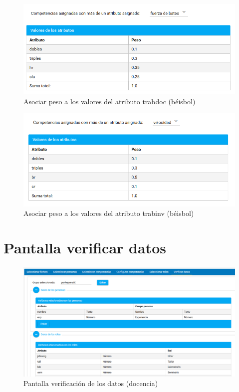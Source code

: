 {\begin{figure}[H]
	\centering
	\includegraphics[width=\textwidth]{figuras/beisbol_conf_comp_fb.png}
	\caption{Asociar peso a los valores del atributo trabdoc (béisbol)} \label{fig:conf_comp_fb_beisbol}
\end{figure}

\begin{figure}[H]
	\centering
	\includegraphics[width=\textwidth]{figuras/beisbol_conf_comp_v.png}
	\caption{Asociar peso a los valores del atributo trabinv (béisbol)} \label{fig:conf_comp_v_beisbol}
\end{figure}


\chapter{Pantalla verificar datos}
\begin{figure}[H]
	\centering
	\includegraphics[width=\textwidth]{figuras/docencia_verificacion.png}
	\caption{Pantalla verificación de los datos (docencia)} \label{fig:verificar_datos_docencia}
\end{figure}

}
